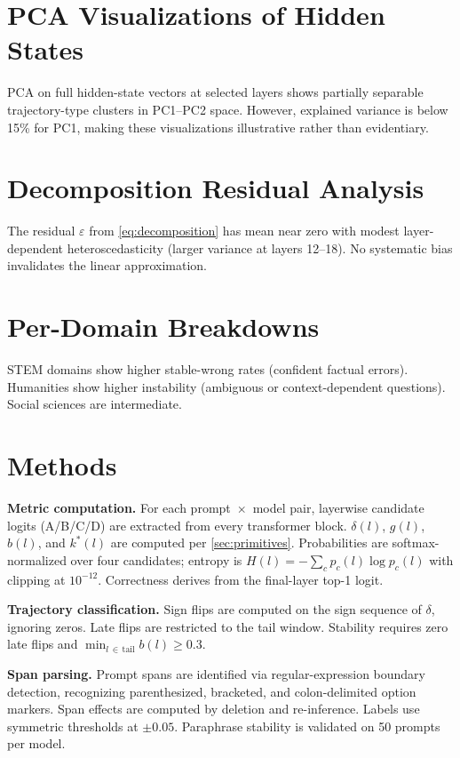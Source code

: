 \documentclass{article}
\begin{document}
\section{PCA Visualizations of Hidden States}
\label{sec:appendix_pca}

PCA on full hidden-state vectors at selected layers shows partially separable trajectory-type clusters in PC1--PC2 space.  However, explained variance is below 15\% for PC1, making these visualizations illustrative rather than evidentiary.

\section{Decomposition Residual Analysis}

The residual $\varepsilon$ from \cref{eq:decomposition} has mean near zero with modest layer-dependent heteroscedasticity (larger variance at layers 12--18).  No systematic bias invalidates the linear approximation.

\section{Per-Domain Breakdowns}

STEM domains show higher stable-wrong rates (confident factual errors).  Humanities show higher instability (ambiguous or context-dependent questions).  Social sciences are intermediate.

\section{Methods}
\label{sec:methods}

\textbf{Metric computation.}  For each prompt~$\times$~model pair, layerwise candidate logits (A/B/C/D) are extracted from every transformer block.  $\delta(l)$, $g(l)$, $b(l)$, and $k^*(l)$ are computed per \cref{sec:primitives}.  Probabilities are softmax-normalized over four candidates; entropy is $H(l) = -\!\sum_c p_c(l)\log p_c(l)$ with clipping at $10^{-12}$.  Correctness derives from the final-layer top-1 logit.

\textbf{Trajectory classification.}  Sign flips are computed on the sign sequence of $\delta$, ignoring zeros.  Late flips are restricted to the tail window.  Stability requires zero late flips and $\min_{l\, \in\, \mathrm{tail}} b(l) \geq 0.3$.

\textbf{Span parsing.}  Prompt spans are identified via regular-expression boundary detection, recognizing parenthesized, bracketed, and colon-delimited option markers.  Span effects are computed by deletion and re-inference.  Labels use symmetric thresholds at $\pm 0.05$.  Paraphrase stability is validated on 50 prompts per model.
\end{document}
